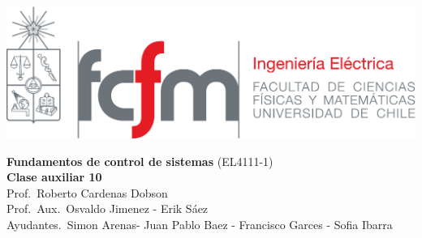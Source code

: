 \documentclass[
  11pt,
  letterpaper,
   addpoints,
   answers
  ]{exam}
\begin{document}
\noindent
\begin{minipage}{0.47\textwidth}
\includegraphics[width=\textwidth]{../fcfm_die}
\end{minipage}
\begin{minipage}{0.53\textwidth}
\begin{center} 
\large\textbf{Fundamentos de control de sistemas} (EL4111-1) \\
\large\textbf{Clase auxiliar 10} \\
\small Prof.~Roberto Cardenas Dobson\\
\small Prof.~Aux.~Osvaldo Jimenez - Erik Sáez\\
\small Ayudantes.~Simon Arenas- Juan Pablo Baez - Francisco Garces - Sofia Ibarra\\
\end{center}
\end{minipage}

\vspace{0.5cm}
\noindent
\vspace{.85cm}
\end{document}
